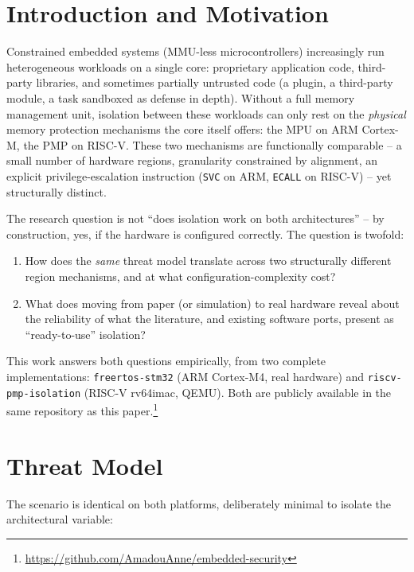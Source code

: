 \documentclass[sigconf,nonacm]{acmart}
\begin{document}
\section{Introduction and Motivation}
\label{sec:intro}

Constrained embedded systems (MMU-less microcontrollers) increasingly run heterogeneous workloads on a single core: proprietary application code, third-party libraries, and sometimes partially untrusted code (a plugin, a third-party module, a task sandboxed as defense in depth). Without a full memory management unit, isolation between these workloads can only rest on the \emph{physical} memory protection mechanisms the core itself offers: the MPU on ARM Cortex-M, the PMP on RISC-V. These two mechanisms are functionally comparable -- a small number of hardware regions, granularity constrained by alignment, an explicit privilege-escalation instruction (\texttt{SVC} on ARM, \texttt{ECALL} on RISC-V) -- yet structurally distinct.

The research question is not ``does isolation work on both architectures'' -- by construction, yes, if the hardware is configured correctly. The question is twofold:

\begin{enumerate}
  \item How does the \emph{same} threat model translate across two structurally different region mechanisms, and at what configuration-complexity cost?
  \item What does moving from paper (or simulation) to real hardware reveal about the reliability of what the literature, and existing software ports, present as ``ready-to-use'' isolation?
\end{enumerate}

This work answers both questions empirically, from two complete implementations: \texttt{freertos-stm32} (ARM Cortex-M4, real hardware) and \texttt{riscv-pmp-isolation} (RISC-V rv64imac, QEMU). Both are publicly available in the same repository as this paper.\footnote{\url{https://github.com/AmadouAnne/embedded-security}}

\section{Threat Model}
\label{sec:threat}

The scenario is identical on both platforms, deliberately minimal to isolate the architectural variable:
\end{document}
